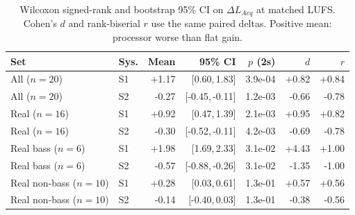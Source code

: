 \begin{table}[!htbp]
\centering
\caption{Wilcoxon signed-rank and bootstrap 95\% CI on $\Delta L_{Aeq}$ at matched LUFS. Cohen's $d$ and rank-biserial $r$ use the same paired deltas. Positive mean: processor worse than flat gain.}
\label{tab:subset}
\renewcommand{\arraystretch}{1.12}
\begin{tabular}{l l r r r r r}
\hline
Set & Sys. & Mean & 95\% CI & $p$ (2s) & $d$ & $r$ \\
\hline
All ($n{=}20$) & S1 & +1.17 & [0.60,\,1.83] & 3.9e-04 & +0.82 & +0.84 \\
All ($n{=}20$) & S2 & -0.27 & [-0.45,\,-0.11] & 1.2e-03 & -0.66 & -0.78 \\
Real ($n{=}16$) & S1 & +0.92 & [0.47,\,1.39] & 2.1e-03 & +0.95 & +0.82 \\
Real ($n{=}16$) & S2 & -0.30 & [-0.52,\,-0.11] & 4.2e-03 & -0.69 & -0.78 \\
Real bass ($n{=}6$) & S1 & +1.98 & [1.69,\,2.33] & 3.1e-02 & +4.43 & +1.00 \\
Real bass ($n{=}6$) & S2 & -0.57 & [-0.88,\,-0.26] & 3.1e-02 & -1.35 & -1.00 \\
Real non-bass ($n{=}10$) & S1 & +0.28 & [0.03,\,0.61] & 1.3e-01 & +0.57 & +0.56 \\
Real non-bass ($n{=}10$) & S2 & -0.14 & [-0.40,\,0.03] & 1.3e-01 & -0.38 & -0.56 \\
\hline
\end{tabular}
\end{table}
